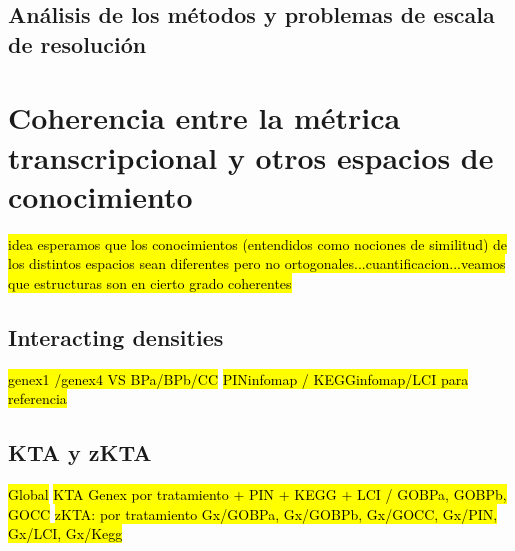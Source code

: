 \subsection{Análisis de los métodos y problemas de escala de resolución}

\section{Coherencia entre la métrica transcripcional y otros espacios de conocimiento}
\hl{idea esperamos que los conocimientos (entendidos como nociones de similitud) de los distintos espacios sean diferentes pero no ortogonales...cuantificacion...veamos que estructuras son en cierto grado coherentes}
\subsection{Interacting densities}
\hl{genex1 /genex4  VS BPa/BPb/CC}
\hl{PINinfomap / KEGGinfomap/LCI para referencia}
\subsection{KTA y zKTA}
\hl{Global}
\hl{KTA Genex por tratamiento + PIN + KEGG + LCI / GOBPa, GOBPb, GOCC}
\hl{zKTA: por tratamiento Gx/GOBPa, Gx/GOBPb, Gx/GOCC, Gx/PIN, Gx/LCI, Gx/Kegg}